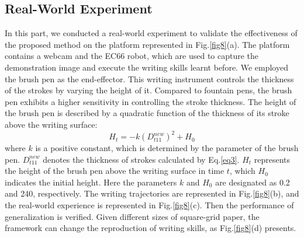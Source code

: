 \documentclass[conference]{IEEEtran}
\begin{document}
\subsection{Real-World Experiment}
In this part, we conducted a real-world experiment to validate the effectiveness of the proposed method on the platform represented in Fig.\ref{fig8}(a). The platform contains a webcam and the EC66 robot, which are used to capture the demonstration image and execute the writing skills learnt before. We employed the brush pen as the end-effector. This writing instrument controls the thickness of the strokes by varying the height of it. Compared to fountain pens, the brush pen exhibits a higher sensitivity in controlling the stroke thickness. The height of the brush pen is described by a quadratic function of the thickness of its stroke above the writing surface:
\begin{equation}
    H_t=-k(D_{t11}^{new})^2+H_0
\end{equation}
where $k$ is a positive constant, which is determined by the parameter of the brush pen. $D_{t11}^{new}$ denotes the thickness of strokes calculated by Eq.\ref{eq3}. $H_t$ represents the height of the brush pen above the writing surface in time $t$, which $H_0$ indicates the initial height. Here the parameters $k$ and $H_0$ are designated as 0.2 and 240, respectively. The writing trajectories are represented in Fig.\ref{fig8}(b), and the real-world experience is represented in Fig.\ref{fig8}(c). Then the performance of generalization is verified. Given different sizes of square-grid paper, the framework can change the reproduction of writing skills, as Fig.\ref{fig8}(d) presents.
\end{document}
